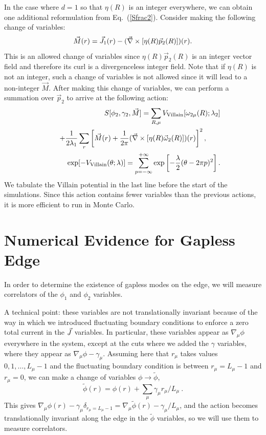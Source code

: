 In the case where $d=1$ so that $\eta(R)$ is an integer everywhere, we can obtain one additional reformulation from Eq.~(\ref{Sfrac2}). Consider making the following change of variables:
\begin{equation}
\vec{M}(r)=\vec{J}_1(r)-(\vec{\nabla}\times[\eta(R)\vec{p}_2(R)])(r).
\end{equation}
This is an allowed change of variables since $\eta(R)\vec{p}_2(R)$ is an integer vector field and therefore its curl is a divergenceless integer field.
Note that if $\eta(R)$ is not an integer, such a change of variables is not allowed since it will lead to a non-integer $\vec{M}$. After making this change of variables, we can perform a summation over $\vec{p}_2$ to arrive at the following action:
\begin{eqnarray}
&& S[\phi_2,\gamma_2,\vec{M}]=
\sum_{R,\mu} V_{\rm Villain}[\omega_{2\mu}(R);\lambda_2] \\
\label{Sint}
&& ~~~ +\frac{1}{2\lambda_1}\sum_r\left[\vec{M}(r)+\frac{1}{2\pi}(\vec{\nabla}\times[\eta(R)\vec{\omega}_{2}(R)])(r)\right]^2, ~~~~~~\\
&& \exp[-V_{\rm Villain}(\theta;\lambda)]=\sum_{p=-\infty}^{+\infty} \exp\left[-\frac{\lambda}{2}(\theta-2\pi p)^2\right] .
\end{eqnarray}
We tabulate the Villain potential in the last line before the start of the simulations.  Since this action contains fewer variables than the previous actions, it is more efficient to run in Monte Carlo. 


\section{Numerical Evidence for Gapless Edge}
\label{sec::results}
In order to determine the existence of gapless modes on the edge, we will measure correlators of the $\phi_1$ and $\phi_2$ variables. 

A technical point: 
these variables are not translationally invariant because of the way in which we introduced fluctuating boundary conditions to enforce a zero total current in the $\vec{J}$ variables. In particular,  these variables appear as $\nabla_\mu\phi$ everywhere in the system, except at the cuts where we added the $\gamma$ variables, where they appear as $\nabla_\mu\phi-\gamma_\mu$. 
Assuming here that $r_\mu$ takes values $0, 1, \dots, L_\mu-1$ and the fluctuating boundary condition is between $r_\mu = L_\mu-1$ and $r_\mu = 0$, we can make a change of variables $\phi \rightarrow \tilde{\phi}$, 
\begin{equation}
\tilde{\phi}(r) = \phi(r) + \sum_\mu \gamma_\mu r_\mu/L_\mu ~.
\end{equation}
This gives $\nabla_\mu \phi(r) - \gamma_\mu \delta_{r_\mu = L_\mu-1} = 
\nabla_\mu \tilde{\phi}(r) - \gamma_\mu/L_\mu$, and the action becomes translationally invariant along the edge in the $\tilde{\phi}$ variables, so we will use them to measure correlators.

